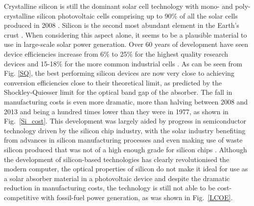 \documentclass[11pt, twoside]{report}
\begin{document}
Crystalline silicon is still the dominant solar cell technology with mono- and poly-crystalline silicon photovoltaic cells comprising up to 90\% of all the solar cells produced in 2008  \cite{Si_rev}. Silicon is the second most abundant element in the Earth's crust \cite{Si_abundance}. When considering this aspect alone, it seems to be a plausible material to use in large-scale solar power generation. Over 60 years of development have seen device efficiencies increase from 6\% to 25\% for the highest quality research devices and 15-18\% for the more common industrial cells \cite{Si_rev}. As can be seen from Fig. \ref{SQ}, the best performing silicon devices are now very close to achieving conversion efficiencies close to their theoretical limit, as predicted by the Shockley-Quiesser limit \cite{SQ_1961} for the optical band gap of the absorber. The fall in manufacturing costs is even more dramatic, more than halving between 2008 and 2013 and being a hundred times lower than they were in 1977, as shown in Fig.~\ref{Si_cost}. This development was largely aided by progress in semiconductor technology driven by the silicon chip industry, with the solar industry benefiting from advances in silicon manufacturing processes and even making use of waste silicon produced that was not of a high enough grade for silicon chips \cite{PV_history1}. Although the development of silicon-based technologies has clearly revolutionised the modern computer, the optical properties of silicon do not make it ideal for use as a solar absorber material in a photovoltaic device and despite the dramatic reduction in manufacturing costs, the technology is still not able to be cost-competitive with fossil-fuel power generation, as was shown in Fig.~\ref{LCOE}.
\end{document}
